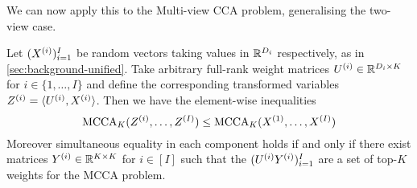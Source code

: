 We can now apply this to the Multi-view CCA problem, generalising the two-view case.
\begin{lemma}\label{lem:interlacing-for-cca}
Let $(X^{(i)})_{i=1}^I$ be random vectors taking values in $\mathbb{R}^{D_i}$ respectively, as in \cref{sec:background-unified}.
Take arbitrary full-rank weight matrices $U^{(i)} \in \mathbb{R}^{D_i \times K}$ for $i \in \{1,\dots, I\}$ and define the corresponding transformed variables $Z^{(i)} = \langle U^{(i)}, X^{(i)}\rangle$.
Then we have the element-wise inequalities
\begin{equation}\label{eq:cca-interlacing}
\operatorname{MCCA}_K(Z^{(i)}, \dots, Z^{(I)}) \leq \operatorname{MCCA}_K(X^{(1)},\dots, X^{(I)})
\end{equation}
Moreover simultaneous equality in each component holds if and only if there exist matrices $Y^{(i)} \in \mathbb{R}^{K\times K}$ for $i \in [I]$ such that the $(U^{(i)}Y^{(i)})_{i=1}^I$ are a set of top-$K$ weights for the MCCA problem.
\end{lemma}
